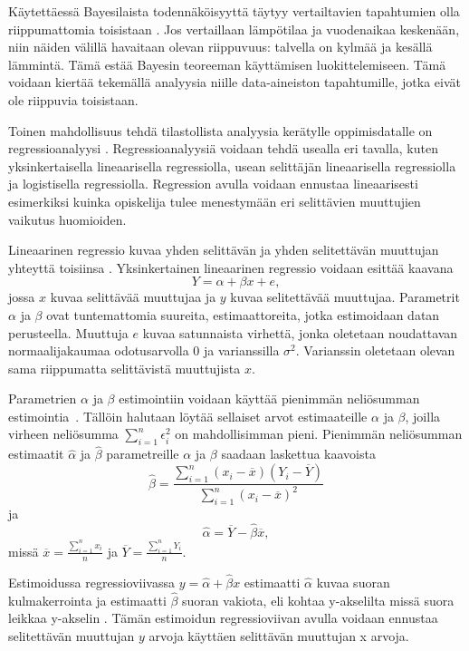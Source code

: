 Käytettäessä Bayesilaista todennäköisyyttä täytyy vertailtavien tapahtumien olla riippumattomia toisistaan \citep{natinggaDataScienceAlgorithms2018}. Jos vertaillaan lämpötilaa ja vuodenaikaa keskenään, niin näiden välillä havaitaan olevan riippuvuus: talvella on kylmää ja kesällä lämmintä. Tämä estää Bayesin teoreeman käyttämisen luokittelemiseen. Tämä voidaan kiertää tekemällä analyysia niille data-aineiston tapahtumille, jotka eivät ole riippuvia toisistaan.

Toinen mahdollisuus tehdä tilastollista analyysia kerätylle oppimisdatalle on regressioanalyysi \citep{songLearningAnalyticsEducational2018, romeroEducationalDataMining2010, papamitsiouLearningAnalyticsEducational2014}. Regressioanalyysiä voidaan tehdä usealla eri tavalla, kuten yksinkertaisella lineaarisella regressiolla, usean selittäjän lineaarisella regressiolla ja logistisella regressiolla. Regression avulla voidaan ennustaa lineaarisesti esimerkiksi kuinka opiskelija tulee menestymään eri selittävien muuttujien vaikutus huomioiden.

Lineaarinen regressio kuvaa yhden selittävän ja yhden selitettävän muuttujan yhteyttä toisiinsa \citep{rossIntroductoryStatistics2017}. Yksinkertainen lineaarinen regressio voidaan esittää kaavana $$Y = \alpha + \beta x + e,$$ jossa $x$ kuvaa selittävää muuttujaa ja $y$ kuvaa selitettävää muuttujaa. Parametrit $\alpha$ ja $\beta$ ovat tuntemattomia suureita, estimaattoreita, jotka estimoidaan datan perusteella. Muuttuja $e$ kuvaa satunnaista virhettä, jonka oletetaan noudattavan normaalijakaumaa odotusarvolla $0$ ja varianssilla $\sigma^2$. Varianssin oletetaan olevan sama riippumatta selittävistä muuttujista $x$.

Parametrien $\alpha$ ja $\beta$ estimointiin voidaan käyttää pienimmän neliösumman estimointia~\citep{rossIntroductoryStatistics2017}. Tällöin halutaan löytää sellaiset arvot estimaateille $\alpha$ ja $\beta$, joilla virheen neliösumma $\sum^n_{i=1} \epsilon^2_i$ on mahdollisimman pieni. Pienimmän neliösumman estimaatit $\hat{\alpha}$ ja $\hat{\beta}$ parametreille $\alpha$ ja $\beta$ saadaan laskettua kaavoista $$\hat{\beta} = \frac{\sum^n_{i=1}(x_i - \overline{x})(Y_i - \overline{Y})}{\sum^n_{i=1}(x_i - \overline{x})^2}$$ ja $$\hat{\alpha} = \overline{Y} - \hat{\beta}\overline{x},$$ missä $\overline{x} = \frac{\sum^n_{i=1}x_i}{n}$ ja $\overline{Y} = \frac{\sum^n_{i=1}Y_i}{n}$.

Estimoidussa regressioviivassa $y = \hat{\alpha} + \hat{\beta}x$ estimaatti $\hat{\alpha}$ kuvaa suoran kulmakerrointa ja estimaatti $\hat{\beta}$ suoran vakiota, eli kohtaa y-akselilta missä suora leikkaa y-akselin \citep{rossIntroductoryStatistics2017}. Tämän estimoidun regressioviivan avulla voidaan ennustaa selitettävän muuttujan $y$ arvoja käyttäen selittävän muuttujan x arvoja.

